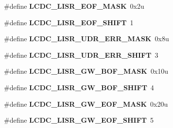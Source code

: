 \begin{DoxyCompactItemize}
\item 
\hypertarget{group___l_c_d_c___register___masks_gad846ab35ef817c538415ec03e024f5d5}{}\#define {\bfseries L\+C\+D\+C\+\_\+\+L\+I\+S\+R\+\_\+\+E\+O\+F\+\_\+\+M\+A\+S\+K}~0x2u\label{group___l_c_d_c___register___masks_gad846ab35ef817c538415ec03e024f5d5}

\item 
\hypertarget{group___l_c_d_c___register___masks_ga1b8e319d286cf73de8f2bf795a6a14df}{}\#define {\bfseries L\+C\+D\+C\+\_\+\+L\+I\+S\+R\+\_\+\+E\+O\+F\+\_\+\+S\+H\+I\+F\+T}~1\label{group___l_c_d_c___register___masks_ga1b8e319d286cf73de8f2bf795a6a14df}

\item 
\hypertarget{group___l_c_d_c___register___masks_ga25710b7d218dbce79e5563deb47bfc08}{}\#define {\bfseries L\+C\+D\+C\+\_\+\+L\+I\+S\+R\+\_\+\+U\+D\+R\+\_\+\+E\+R\+R\+\_\+\+M\+A\+S\+K}~0x8u\label{group___l_c_d_c___register___masks_ga25710b7d218dbce79e5563deb47bfc08}

\item 
\hypertarget{group___l_c_d_c___register___masks_ga12fcb48bb255e9f3ba44dededfb3981a}{}\#define {\bfseries L\+C\+D\+C\+\_\+\+L\+I\+S\+R\+\_\+\+U\+D\+R\+\_\+\+E\+R\+R\+\_\+\+S\+H\+I\+F\+T}~3\label{group___l_c_d_c___register___masks_ga12fcb48bb255e9f3ba44dededfb3981a}

\item 
\hypertarget{group___l_c_d_c___register___masks_gad046b2cc805f87b476a98e8da4f87328}{}\#define {\bfseries L\+C\+D\+C\+\_\+\+L\+I\+S\+R\+\_\+\+G\+W\+\_\+\+B\+O\+F\+\_\+\+M\+A\+S\+K}~0x10u\label{group___l_c_d_c___register___masks_gad046b2cc805f87b476a98e8da4f87328}

\item 
\hypertarget{group___l_c_d_c___register___masks_gae511ef0b3a45044446ef4173d397b8ee}{}\#define {\bfseries L\+C\+D\+C\+\_\+\+L\+I\+S\+R\+\_\+\+G\+W\+\_\+\+B\+O\+F\+\_\+\+S\+H\+I\+F\+T}~4\label{group___l_c_d_c___register___masks_gae511ef0b3a45044446ef4173d397b8ee}

\item 
\hypertarget{group___l_c_d_c___register___masks_ga5eb02d83a4f12146c1fb1c49c17fa2d3}{}\#define {\bfseries L\+C\+D\+C\+\_\+\+L\+I\+S\+R\+\_\+\+G\+W\+\_\+\+E\+O\+F\+\_\+\+M\+A\+S\+K}~0x20u\label{group___l_c_d_c___register___masks_ga5eb02d83a4f12146c1fb1c49c17fa2d3}

\item 
\hypertarget{group___l_c_d_c___register___masks_gac7ec5c51f46990c1a289cd22cbbf2d11}{}\#define {\bfseries L\+C\+D\+C\+\_\+\+L\+I\+S\+R\+\_\+\+G\+W\+\_\+\+E\+O\+F\+\_\+\+S\+H\+I\+F\+T}~5\label{group___l_c_d_c___register___masks_gac7ec5c51f46990c1a289cd22cbbf2d11}


\end{DoxyCompactItemize}
